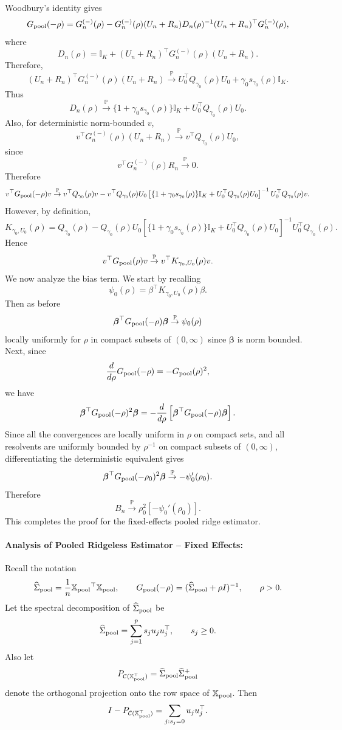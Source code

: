 \documentclass{article}
\theoremstyle{plain}
\theoremstyle{remark}
\def \bbeta{\boldsymbol{\beta}}
\def \bbeta{\boldsymbol{\beta}}
\def \Xm {\mathbb{X}_{\rm pool}}
\def \I{\mathcal{I}}
\def \P{\mathbb{P}}
\def \I {\mathbb{I}}
\begin{document}
Woodbury's identity gives
\[
G_{\rm pool}(-\rho)
=
G_n^{(-)}(\rho)
-
G_n^{(-)}(\rho)(U_n+R_n)
D_n(\rho)^{-1}
(U_n+R_n)^\top G_n^{(-)}(\rho),
\]
where
\[
D_n(\rho)
=
\I_K+(U_n+R_n)^\top G_n^{(-)}(\rho)(U_n+R_n).
\]
Therefore, \[
(U_n+R_n)^\top G_n^{(-)}(\rho)(U_n+R_n)
\stackrel{\P}{\to}
U_0^\top Q_{\gamma_0}(\rho)U_0
+
\gamma_0s_{\gamma_0}(\rho)\I_K.
\]
Thus
\[
D_n(\rho)
\stackrel{\P}{\to}
\{1+\gamma_0s_{\gamma_0}(\rho)\}\I_K
+
U_0^\top Q_{\gamma_0}(\rho)U_0.
\]
Also, for deterministic norm-bounded \(v\),
\[
v^\top G_n^{(-)}(\rho)(U_n+R_n)
\stackrel{\P}{\to}
v^\top Q_{\gamma_0}(\rho)U_0,
\]
since
\[
v^\top G_n^{(-)}(\rho)R_n\stackrel{\P}{\to}0.
\]
Therefore
\[
v^\top G_{\rm pool}(-\rho)v
\stackrel{\P}{\to}
v^\top Q_{\gamma_0}(\rho)v
-
v^\top Q_{\gamma_0}(\rho)U_0
\left[
\{1+\gamma_0s_{\gamma_0}(\rho)\}\I_K
+
U_0^\top Q_{\gamma_0}(\rho)U_0
\right]^{-1}
U_0^\top Q_{\gamma_0}(\rho)v.
\]
However, by definition,
\[
K_{\gamma_0,U_0}(\rho)
=
Q_{\gamma_0}(\rho)
-
Q_{\gamma_0}(\rho)U_0
\left[
\{1+\gamma_0s_{\gamma_0}(\rho)\}\I_K
+
U_0^\top Q_{\gamma_0}(\rho)U_0
\right]^{-1}
U_0^\top Q_{\gamma_0}(\rho).
\]
Hence
\[
v^\top G_{\rm pool}(\rho)v
\stackrel{\P}{\to}
v^\top K_{\gamma_0,U_0}(\rho)v.
\]
We now analyze the bias term. We start by recalling
\[
\psi_0(\rho)=\beta^\top K_{\gamma_0,U_0}(\rho)\beta.
\]
Then as before
\[
\bbeta^\top G_{\rm pool}(-\rho)\bbeta
\stackrel{\P}{\to}
\psi_0(\rho)
\]
locally uniformly for \(\rho\) in compact subsets of \((0,\infty)\) since $\bbeta$ is norm bounded. Next, since
\[
\frac{d}{d\rho}G_{\rm pool}(-\rho)
=
-G_{\rm pool}(\rho)^2,
\]
we have
\[
\bbeta^\top G_{\rm pool}(-\rho)^2\bbeta
=
-\frac{d}{d\rho}
\left[
\bbeta^\top G_{\rm pool}(-\rho)\bbeta
\right].
\]
Since all the convergences are locally uniform in $\rho$ on compact sets, and all resolvents are uniformly bounded by \(\rho^{-1}\) on compact subsets of \((0,\infty)\), differentiating the deterministic equivalent gives
\[
\bbeta^\top G_{\rm pool}(-\rho_0)^2\bbeta
\stackrel{\P}{\to}
-\psi_0'(\rho_0).
\]
Therefore
\[
B_n
\stackrel{\P}{\to}
\rho_0^2[-\psi_0'(\rho_0)].
\]
This completes the proof for the \textcolor{black}{fixed-effects pooled} ridge estimator.

\paragraph{Analysis of Pooled Ridgeless Estimator -- Fixed Effects:}
Recall the notation
\[
\widehat\Sigma_{\rm pool}=\frac1n\textcolor{black}{\Xm}^\top \textcolor{black}{\Xm},
\qquad
G_{\rm pool}(-\rho)=(\widehat\Sigma_{\textcolor{black}{\rm pool}}+\rho I)^{-1},
\qquad
\rho>0.
\]
Let the spectral decomposition of \(\widehat\Sigma_{\rm pool}\) be
\[
\widehat\Sigma_{\rm pool}
=
\sum_{j=1}^p s_j u_ju_j^\top,
\qquad
s_j\ge 0.
\]
Also \textcolor{black}{let}
\[
P_{\mathcal{C}(\textcolor{black}{\Xm^\top})}=\widehat\Sigma_{\rm pool}\widehat\Sigma_{\rm pool}^+
\]
\textcolor{black}{denote} the orthogonal projection onto the row space of \(\textcolor{black}{\Xm}\). Then
\[
I-P_{\mathcal{C}(\textcolor{black}{\Xm^\top})}
=
\sum_{j:s_j=0}u_ju_j^\top.
\]
\end{document}

